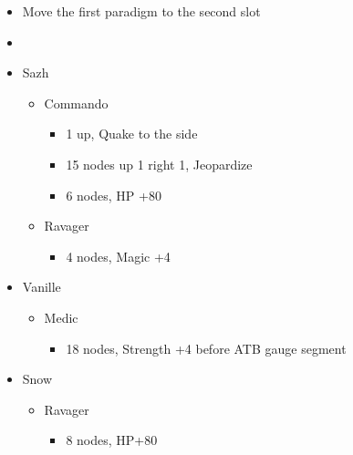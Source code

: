 \begin{menu}
\begin{multicols}{2}
\begin{itemize}
    \paradigm
    \begin{itemize}
        \item Move the first paradigm to the second slot
        \item {}%
{\paradigmline{(\syn)}{\sab}{\rav}}%
{\paradigmline{\com}{\med}{\com}}%
{\paradigmline{\syn}{\med}{\com}}%
{\paradigmline{\com}{\sab}{\com}}%
{\paradigmline[5]{\textit{\syn}}{\textit{\sab}}{\textit{\com}}}%
{\paradigmline{\com}{\rav}{\com}}
    \end{itemize}
    \crystarium
    \begin{itemize}
        \item Sazh
        \begin{itemize}
            \item Commando
            \begin{itemize}
                \item 1 up, Quake to the side
                \item 15 nodes up 1 right 1, Jeopardize
                \item 6 nodes, HP +80
            \end{itemize}
            \item Ravager
            \begin{itemize}
                \item 4 nodes, Magic +4
            \end{itemize}
        \end{itemize}
        \item Vanille
        \begin{itemize}
            \item Medic
            \begin{itemize}
                \item 18 nodes, Strength +4 before ATB gauge segment
            \end{itemize}
        \end{itemize}
        \item Snow
        \begin{itemize}
            \item Ravager
            \begin{itemize}
                \item 8 nodes, HP+80
            \end{itemize}

\end{itemize}
\end{itemize}
\end{itemize}
\end{multicols}
\end{menu}
